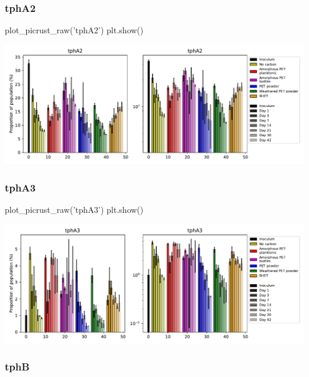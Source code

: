 \documentclass[
]{article}
\newenvironment{Shaded}{\begin{snugshade}}{\end{snugshade}}
\newcommand{\NormalTok}[1]{#1}
\newcommand{\StringTok}[1]{\textcolor[rgb]{0.31,0.60,0.02}{#1}}
\begin{document}
\hypertarget{tpha2}{%
\subsubsection{tphA2}\label{tpha2}}

\begin{Shaded}
\begin{Highlighting}[]
\NormalTok{plot_picrust_raw(}\StringTok{'tphA2'}\NormalTok{)}
\NormalTok{plt.show()}
\end{Highlighting}
\end{Shaded}

\includegraphics{20-6-15-PET-plastisphere-PICRUSt2_files/figure-latex/plot_raw_tphA2-1.pdf}

\hypertarget{tpha3}{%
\subsubsection{tphA3}\label{tpha3}}

\begin{Shaded}
\begin{Highlighting}[]
\NormalTok{plot_picrust_raw(}\StringTok{'tphA3'}\NormalTok{)}
\NormalTok{plt.show()}
\end{Highlighting}
\end{Shaded}

\includegraphics{20-6-15-PET-plastisphere-PICRUSt2_files/figure-latex/plot_raw_tphA3-1.pdf}

\hypertarget{tphb}{%
\subsubsection{tphB}\label{tphb}}
\end{document}
